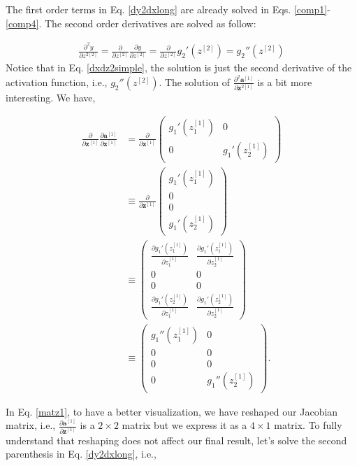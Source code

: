 \documentclass{article}
\begin{document}
The first order terms in Eq. \eqref{dy2dxlong}  are already solved in Eqs. \eqref{comp1}-\eqref{comp4}. The second order derivatives are solved as follow:

\begin{align}
\label{dxdz2simple}
 \frac{\partial^2 y}{\partial z^{2{[2]}}} = \frac{\partial}{\partial z^{[2]}} \frac{\partial y}{\partial z^{[2]}} = \frac{\partial}{\partial z^{[2]}}g_2'(z^{[2]} )= g_2''(z^{[2]})
\end{align}
Notice that in Eq. \eqref{dxdz2simple}, the solution is just the second derivative of the activation function, i.e., $g_2''(z^{[2]})$. The solution of $\frac{\partial^2 \textbf{a}^{[1]}}{\partial \textbf{z}^{2{[1]}}}$ is a bit more interesting. We have, 

\begin{align}
\frac{\partial}{\partial \textbf{z}^{[1]}} \frac{\partial \textbf{a}^{[1]}}{\partial \textbf{z}^{[1]}}  &= \frac{\partial}{\partial \textbf{z}^{[1]}} \begin{pmatrix}
g_1'(z_1^{[1]}) & 0 \\
0 & g_1'(z_2^{[1]})
\end{pmatrix} \\
&\equiv  \frac{\partial}{\partial \textbf{z}^{[1]}} \begin{pmatrix}
g_1'(z_1^{[1]}) \\ 0 \\
0 \\ g_1'(z_2^{[1]})
\end{pmatrix} \\
&\equiv 
\begin{pmatrix}
\frac{\partial g_1'(z_1^{[1]})}{\partial z_1^{[1]}}  & \frac{\partial g_1'(z_1^{[1]})}{\partial z_2^{[1]}} \\ 0 & 0 \\
0 & 0 \\ \frac{\partial g_1'(z_2^{[1]})}{\partial z_1^{[1]}} & \frac{\partial g_1'(z_2^{[1]})}{\partial z_2^{[1]}}
\end{pmatrix} \\
&\equiv 
\begin{pmatrix}
g_1''(z_1^{[1]})  & 0 \\ 0 & 0 \\
0 & 0 \\ 0 & g_1''(z_2^{[1]})
\end{pmatrix}.
\label{matz1}
\end{align}

In Eq. \eqref{matz1}, to have a better visualization, we have reshaped our Jacobian matrix, i.e., $\frac{\partial \textbf{a}^{[1]}}{\partial \textbf{z}^{[1]}}$ is a $2\times 2$ matrix but we express it as a $4\times 1$ matrix. To fully understand that reshaping does not affect our final result, let's solve the second parenthesis in Eq. \eqref{dy2dxlong}, i.e.,
\end{document}
